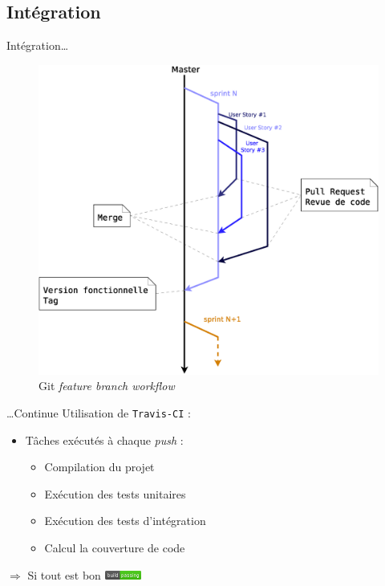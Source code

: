 \AntoineSpeak
\subsection{Intégration}
\begin{frame}{Intégration\ldots}
\begin{figure}
	\centering
	\includegraphics[width=0.83\linewidth]{images/Process/BranchingWorkflow}
	\caption{Git \textit{feature branch workflow}}
	\label{fig:BranchingWorkflow}
\end{figure}
\end{frame}
\begin{frame}{\ldots Continue}	
	\vfill
	Utilisation de \texttt{Travis-CI} : 
\begin{itemize}
	\item Tâches exécutés à chaque \textit{push} :
		\begin{itemize}
			\item Compilation du projet
			\item Exécution des tests unitaires
			\item Exécution des tests d'intégration
			\item Calcul la couverture de code
		\end{itemize}
\end{itemize}
\vfill
\centering
$\Longrightarrow$ Si tout est bon \includegraphics[width=1.2cm]{images/build}
\end{frame}
\ZacSpeak
